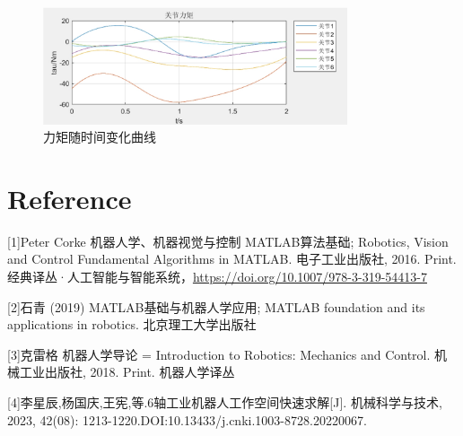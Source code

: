 \documentclass[12pt]{ctexart}
\begin{document}
\begin{figure}[htbp]
    \centering
    \includegraphics[width=0.8\textwidth]{Image/fig59.png}
    \caption{力矩随时间变化曲线}
    \label{fig:59}
\end{figure}

\newpage



\newpage
\section{Reference}
[1]Peter Corke 机器人学、机器视觉与控制 MATLAB算法基础; Robotics, Vision and Control Fundamental Algorithms in MATLAB. 电子工业出版社, 2016. Print. 经典译丛·人工智能与智能系统，\href{https://doi.org/10.1007/978-3-319-54413-7}{https://doi.org/10.1007/978-3-319-54413-7}

[2]石青 (2019) MATLAB基础与机器人学应用; MATLAB foundation and its applications in robotics. 北京理工大学出版社

[3]克雷格 机器人学导论 = Introduction to Robotics: Mechanics and Control. 机械工业出版社, 2018. Print. 机器人学译丛

[4]李星辰,杨国庆,王宪,等.6轴工业机器人工作空间快速求解[J]. 机械科学与技术, 2023, 42(08): 1213-1220.DOI:10.13433/j.cnki.1003-8728.20220067.


\newpage
\end{document}
